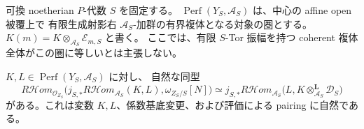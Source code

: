可換 noetherian $P$-代数 $S$ を固定する。
$\operatorname{Perf}(Y_S,\mathscr A_S)$ は、中心の affine open 被覆上で
有限生成射影右 $\mathscr A_S$-加群の有界複体となる対象の圏とする。
$K(m)=K\otimes_{\mathscr A_S}\mathscr E_{m,S}$ と書く。
ここでは、有限 $S$-Tor 振幅を持つ coherent 複体全体がこの圏に等しいとは主張しない。

\begin{lemma}\label{lem:relative-serre-internal-hom}
$K,L\in\operatorname{Perf}(Y_S,\mathscr A_S)$ に対し、
自然な同型
\begin{equation}\label{eq:relative-serre-internal-duality}
 R\mathcal Hom_{\mathcal O_{Z_S}}
 \bigl(j_{S,*}R\mathcal Hom_{\mathscr A_S}(K,L),\omega_{Z_S/S}[N]\bigr)
 \simeq
 j_{S,*}R\mathcal Hom_{\mathscr A_S}
 \bigl(L,K\otimes_{\mathscr A_S}^{\mathbf L}\mathscr D_S\bigr)
\end{equation}
がある。これは変数 $K,L$、係数基底変更、および評価による pairing に自然である。
\end{lemma}

